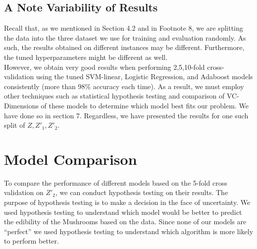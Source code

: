 \documentclass[fleqn]{article}
\begin{document}
    \subsection{A Note Variability of Results}
    Recall that, as we mentioned in Section 4.2 and in Footnote 8, we are splitting the
    data into the three dataset we use for training and evaluation randomly. As such, the
    results obtained on different instances may be different. Furthermore, the tuned
    hyperparameters might be different as well.\\

    However, we obtain very good results when performing 2,5,10-fold cross-validation using the
    tuned SVM-linear, Logistic Regression, and Adaboost models consistently (more than 98\%
    accuracy  each time). As a result, we must employ other techniques such as statistical
    hypothesis testing and comparison of VC-Dimensions of these models to determine which
    model best fits our problem. We have done so in section 7. Regardless, we have presented
    the results for one such split of $ Z, Z'_1, Z'_2 $.

    \section{Model Comparison}
    To compare the performance of different models based on the 5-fold cross validation on
    $ Z'_2 $, we can conduct hypothesis testing on their results. The purpose of hypothesis
    testing is to make a decision in the face of uncertainty. We used hypothesis testing
    to understand which model would be better to predict the edibility of the Mushrooms
    based on the data. Since none of our models are “perfect” we used hypothesis testing
    to understand which algorithm is more likely to perform better.
\end{document}
